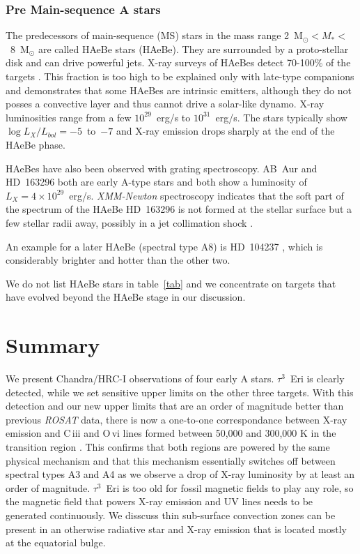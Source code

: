 \documentclass[preprint2]{aastex631}
\begin{document}
\subsubsection{Pre Main-sequence A stars}
The predecessors of main-sequence (MS) stars in the mass range 2~M$_{\odot} < M_* < $~8~M$_{\odot}$ are called HAeBe stars (HAeBe). They are surrounded by a proto-stellar disk and can drive powerful jets.
X-ray surveys of HAeBes detect 70-100\% of the targets
\citep{2004ApJ...614..221S,2005ApJ...618..360H,2006A&A...457..223S,2009A&A...493.1109S,2020ApJ...888...15S}. This fraction is too high to be explained only with late-type companions and demonstrates that some HAeBes are intrinsic emitters, although they do not posses a convective layer and thus cannot drive a solar-like dynamo. X-ray luminosities range from a few $10^{29}$~erg/s to $10^{31}$~erg/s. The stars typically show $\log L_X/L_{bol}= -5$~to~$-7$ and X-ray emission drops sharply at the end of the HAeBe phase.

HAeBes have also been observed with grating spectroscopy. AB~Aur
\citep{2007A&A...468..541T} and HD~163296 \citep{2009A&A...494.1041G} both are early A-type stars and both show a luminosity of
$L_X=4\times 10^{29}$~erg/s. \emph{XMM-Newton} spectroscopy indicates
that the soft part of the spectrum of the HAeBe HD~163296 is not
formed at the stellar surface but a few stellar radii away, possibly
in a jet collimation shock \citep{2009A&A...494.1041G}.

An example for a later HAeBe (spectral type A8) is HD~104237 \citep{2004ApJ...614..221S,2008ApJ...687..579T}, which is considerably brighter and hotter than the other two.

We do not list HAeBe stars in table~\ref{tab} and we concentrate on targets that have evolved beyond the HAeBe stage in our discussion.


\section{Summary}
\label{sec:summary}
We present Chandra/HRC-I observations of four early A stars. $\tau^3$~Eri is clearly detected, while we set sensitive upper limits on the other three targets. With this detection and our new upper limits that are an order of magnitude better than previous \emph{ROSAT} data, there is now a one-to-one correspondance between X-ray emission and C\,{\sc iii} and O\,{\sc vi} lines formed between 50,000 and 300,000 K in the transition region \citep{2002ApJ...579..800S}. This confirms that both regions are powered by the same physical mechanism and that this mechanism essentially switches off between spectral types A3 and A4 as we observe a drop of X-ray luminosity by at least an order of magnitude. $\tau^3$~Eri is too old for fossil magnetic fields to play any role, so the magnetic field that powers X-ray emission and UV lines needs to be generated continuously. We disscuss thin sub-surface convection zones can be present in an otherwise radiative star and X-ray emission that is located mostly at the equatorial bulge.
\end{document}
